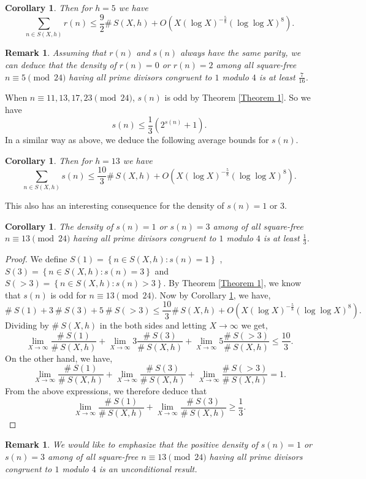 \documentclass[11pt]{article}
\newtheorem{remark}[theorem]{Remark}
\newtheorem{corollary}[theorem]{Corollary}
\begin{document}
\begin{corollary}
Then for $h=5$ we have
$$\sum\limits_{n\in S(X,h)}r(n)\leq \frac{9}{2}\#\, S(X,h)+ O(X(\log X)^{-\frac{5}{8}}(\log \log X)^{8}).$$
\end{corollary}
\begin{remark}
Assuming that $r(n)$ and $s(n)$ always have the same parity, we can deduce that the density of $r(n)=0$ or $r(n)=2$ among all square-free $n\equiv 5 \pmod{24}$ having all prime divisors congruent to $1$ modulo $4$ is at least $\frac{7}{16}$.
\end{remark}
\noindent When $n\equiv 11,13,17,23 \pmod{24}$, $s(n)$ is odd by Theorem \ref{Theorem 1}. So we have
$$s(n)\leq \frac{1}{3}(2^{s(n)}+1).$$
In a similar way as above, we deduce the following average bounds for $s(n)$.
\begin{corollary}\label{cor1}
Then for $h=13$ we have
$$\sum\limits_{n\in S(X,h)}s(n)\leq \frac{10}{3}\#\, S(X,h)+ O(X(\log X)^{-\frac{5}{8}}(\log \log X)^{8}).$$
\end{corollary}
\noindent This also has an interesting consequence for the density of $s(n) =1$ or $3$.
\begin{corollary}\label{s(n)=1}
The density of $s(n)=1$ or $s(n)=3$ among of all square-free $n\equiv 13\pmod{24}$ having all prime divisors congruent to $1$ modulo $4$ is at least $\frac{1}{3}$.   
\end{corollary}
\begin{proof}
We define $S(1)=\left\{n\in S(X,h):s(n)=1\right\}$ , $S(3)=\left\{n\in S(X,h):s(n)=3\right\}$ and $S(>3)=\left\{n\in S(X,h):s(n)>3\right\}$. By Theorem \ref{Theorem 1}, we know that $s(n)$ is odd for  $n\equiv 13 \pmod{24}$. Now by Corollary \ref{cor1}, we have,
$$\#\:S(1)+3\:\#\:S(3)+5\:\#\:S(>3)\leq \frac{10}{3}\#\, S(X,h)+ O(X(\log X)^{-\frac{5}{8}}(\log \log X)^{8}).$$
Dividing by $\#\:S(X,h)$ in the both sides and letting $X\to\infty$ we get, 
$$\lim_{X\to\infty}\frac{\#\:S(1)}{\#\:S(X,h)}+\lim_{X\to\infty}3\frac{\#\:S(3)}{\#\:S(X,h)}+\lim_{X\to\infty}5\frac{\#\:S(>3)}{\#\:S(X,h)}\leq \frac{10}{3}.$$
On the other hand, we have,
$$\lim_{X\to\infty}\frac{\#\:S(1)}{\#\:S(X,h)}+\lim_{X\to\infty}\frac{\#\:S(3)}{\#\:S(X,h)}+\lim_{X\to\infty}\frac{\#\:S(>3)}{\#\:S(X,h)}=1.$$
From the above expressions, we therefore deduce that
$$\lim_{X\to\infty}\frac{\#\:S(1)}{\#\:S(X,h)}+\lim_{X\to\infty}\frac{\#\:S(3)}{\#\:S(X,h)}\geq \frac{1}{3}.$$
\end{proof}
\begin{remark}
We would like to emphasize that the positive density of $s(n)=1$ or $s(n)=3$ among of all square-free $n\equiv 13\pmod{24}$ having all prime divisors congruent to $1$ modulo $4$ is an unconditional result. 
\end{remark}
\end{document}
